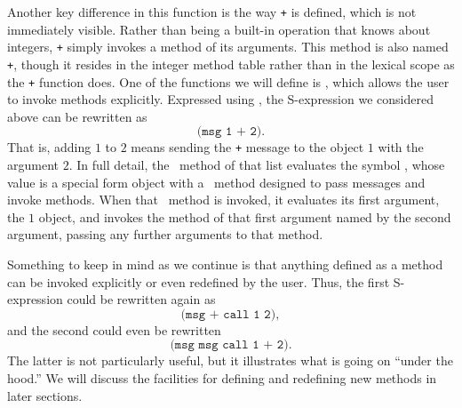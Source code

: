 \documentclass[twocolumn]{article}
\begin{document}
Another key difference in this function is the way \texttt{+} is
defined, which is not immediately visible. Rather than being a
built-in operation that knows about integers, \texttt{+} simply
invokes a method of its arguments. This method is also named
\texttt{+}, though it resides in the integer method table rather than
in the lexical scope as the \texttt{+} function does. One of the
functions we will define is \msg, which allows the user to invoke
methods explicitly. Expressed using \msg, the S-expression we
considered above can be rewritten as
\[\texttt{(msg 1 + 2)}.\]
That is, adding $1$ to $2$ means sending the \texttt{+} message to the
object $1$ with the argument $2$. In full detail, the \eval\ method of
that list evaluates the symbol \msg, whose value is a special form
object with a \call\ method designed to pass messages and invoke
methods. When that \call\ method is invoked, it evaluates its first
argument, the $1$ object, and invokes the method of that first
argument named by the second argument, passing any further arguments
to that method.

Something to keep in mind as we continue is that anything defined as a
method can be invoked explicitly or even redefined by the user. Thus,
the first S-expression could be rewritten again as
\[ \texttt{(msg + call 1 2)}, \]
and the second could even be rewritten
\[ \texttt{(msg msg call 1 + 2)}. \] The latter is not particularly
useful, but it illustrates what is going on ``under the hood.'' We
will discuss the facilities for defining and redefining new methods in
later sections.
\end{document}
